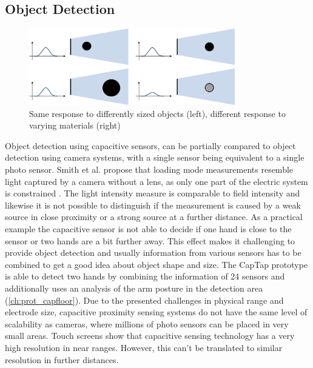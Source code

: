 \subsection{Object Detection}
\begin{figure}[ht]
\centering
\includegraphics[width=0.8\textwidth]{images/limit_detection}
\caption{Same response to differently sized objects (left), different response to varying materials (right)}
\label{fig:disc_obj_detection}
\end{figure}

Object detection using capacitive sensors, can be partially compared to object detection using camera systems, with a single sensor being equivalent to a single photo sensor. Smith et al. propose that loading mode measurements resemble light captured by a camera without a lens, as only one part of the electric system is constrained \cite{smith1998electric}. The light intensity measure is comparable to field intensity and likewise it is not possible to distinguish if the measurement is caused by a weak source in close proximity or a strong source at a further distance. As a practical example the capacitive sensor is not able to decide if one hand is close to the sensor or two hands are a bit further away. This effect makes it challenging to provide object detection and usually information from various sensors has to be combined to get a good idea about object shape and size. The CapTap prototype is able to detect two hands by combining the information of 24 sensors and additionally uses an analysis of the arm posture in the detection area (\ref{ch:prot_capfloor}). Due to the presented challenges in physical range and electrode size, capacitive proximity sensing systems do not have the same level of scalability as cameras, where millions of photo sensors can be placed in very small areas. Touch screens show that capacitive sensing technology has a very high resolution in near ranges. However, this can't be translated to similar resolution in further distances.


